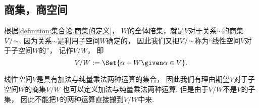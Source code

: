 \subsection{商集，商空间}
根据\cref{definition:集合论.商集的定义}，
\(W\)的全体陪集，就是\(V\)对于关系\(\sim\)的商集\(V/\kern-2pt\sim\).
因为关系\(\sim\)是利用子空间\(W\)确定的，
因此我们又把\(V/\kern-2pt\sim\)称为“线性空间\(V\)对于子空间\(W\)的”，
记作\(V/W\)，
即\begin{equation*}
	V/W
	\defeq
	\Set{ \alpha+W \given \alpha \in V }.
\end{equation*}

线性空间\(V\)是具有加法与纯量乘法两种运算的集合，
因此我们有理由期望\(V\)对于子空间\(W\)的商集\(V/W\)
也可以定义加法与纯量乘法两种运算.
但是由于\(V/W\)不是\(V\)的子集，
因此不能把\(V\)的两种运算直接搬到\(V/W\)中来.

